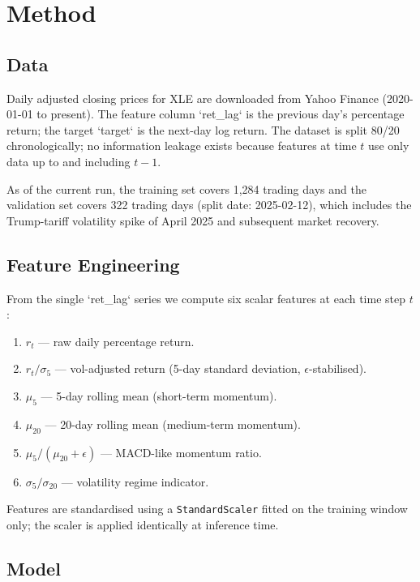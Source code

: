 \documentclass{article}
\begin{document}
\section{Method}

\subsection{Data}

Daily adjusted closing prices for XLE are downloaded from Yahoo Finance
(2020-01-01 to present). The feature column `ret\_lag` is the previous day's
percentage return; the target `target` is the next-day log return.
The dataset is split 80/20 chronologically; no information leakage exists because
features at time $t$ use only data up to and including $t-1$.

As of the current run, the training set covers 1{,}284 trading days and the validation
set covers 322 trading days (split date: 2025-02-12), which includes
the Trump-tariff volatility spike of April 2025 and subsequent market recovery.

\subsection{Feature Engineering}

From the single `ret\_lag` series we compute six scalar features at each time step $t$:

\begin{enumerate}
  \item $r_t$ --- raw daily percentage return.
  \item $r_t / \sigma_5$ --- vol-adjusted return (5-day standard deviation, $\epsilon$-stabilised).
  \item $\mu_5$ --- 5-day rolling mean (short-term momentum).
  \item $\mu_{20}$ --- 20-day rolling mean (medium-term momentum).
  \item $\mu_5 / (\mu_{20} + \epsilon)$ --- MACD-like momentum ratio.
  \item $\sigma_5 / \sigma_{20}$ --- volatility regime indicator.
\end{enumerate}

Features are standardised using a \texttt{StandardScaler} fitted on the training
window only; the scaler is applied identically at inference time.

\subsection{Model}
\end{document}
